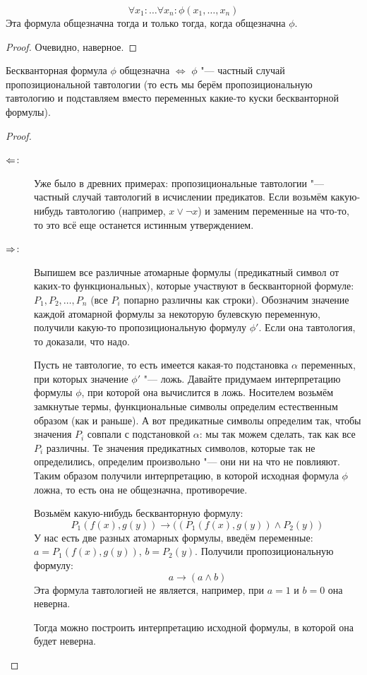 \begin{assertion}
	\[
		\forall x_1 \colon \dots \forall x_n \colon \phi(x_1, \dots, x_n)
	\]
	Эта формула общезначна тогда и только тогда, когда общезначна $\phi$.
\end{assertion}
\begin{proof}
	Очевидно, наверное.
\end{proof}

\begin{theorem}
	Бескванторная формула $\phi$ общезначна $\iff$ $\phi$ "--- частный случай
	пропозициональной тавтологии (то есть мы берём пропозициональную тавтологию
	и подставляем вместо переменных какие-то куски бескванторной формулы).
\end{theorem}
\begin{proof}
	\begin{description}
		\item[$\Leftarrow$:]
			Уже было в древних примерах: пропозициональные тавтологии "--- частный случай тавтологий в исчислении предикатов.
			Если возьмём какую-нибудь тавтологию (например, $x \lor \lnot x$) и заменим переменные на что-то,
			то это всё еще останется истинным утверждением.
		\item[$\Rightarrow$:]
			Выпишем все различные атомарные формулы (предикатный символ от каких-то функциональных),
			которые участвуют в бескванторной формуле: $P_1, P_2, \dots, P_n$ (все $P_i$ попарно различны как строки).
			Обозначим значение каждой атомарной формулы за некоторую булевскую переменную, получили
			какую-то пропозициональную формулу $\phi'$.
			Если она тавтология, то доказали, что надо.

			Пусть не тавтологие, то есть имеется какая-то подстановка $\alpha$ переменных, при которых
			значение $\phi'$ "--- ложь.
			Давайте придумаем интерпретацию формулы $\phi$, при которой она вычислится в ложь.
			Носителем возьмём замкнутые термы, функциональные символы определим естественным образом
			(как и раньше).
			А вот предикатные символы определим так, чтобы значения $P_i$ совпали с подстановкой
			$\alpha$: мы так можем сделать, так как все $P_i$ различны.
			Те значения предикатных символов, которые так не определились, определим произвольно "--- они ни на что не повлияют.
			Таким образом получили интерпретацию, в которой исходная формула $\phi$ ложна, то есть она не общезначна, противоречие.

			\begin{exmp}
				Возьмём какую-нибудь бескванторную формулу:
				\[ P_1(f(x), g(y)) \to ((P_1(f(x), g(y)) \land P_2(y)) \]
				У нас есть две разных атомарных формулы, введём переменные: $a=P_1(f(x), g(y))$, $b=P_2(y)$.
				Получили пропозициональную формулу:
				\[ a \to (a \land b) \]
				Эта формула тавтологией не является, например, при $a=1$ и $b=0$ она неверна.

				Тогда можно построить интерпретацию исходной формулы, в которой она будет неверна.
			\end{exmp}
	\end{description}
\end{proof}

